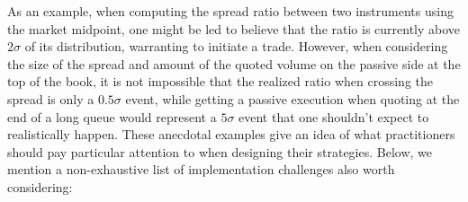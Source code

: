 As an example, when computing the spread ratio between two instruments using the market midpoint, one might be led to believe that the ratio is currently above $2\sigma$ of its distribution, warranting to initiate a trade. However, when considering the size of the spread and amount of the quoted volume on the passive side at the top of the book, it is not impossible that the realized ratio when crossing the spread is only a $0.5\sigma$ event, while getting a passive execution when quoting at the end of a long queue would represent a $5\sigma$ event that one shouldn't expect to realistically happen. These anecdotal examples give an idea of what practitioners should pay particular attention to when designing their strategies. Below, we mention a non-exhaustive list of implementation challenges also worth considering:


